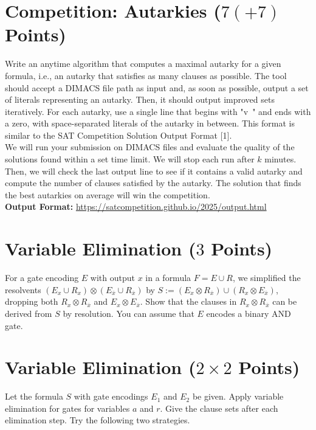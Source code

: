\documentclass[a4paper]{article}
\begin{document}

\newcommand{\statetilled}{T}
\newcommand{\statetobetilled}{$+$}
\newcommand{\statenottobetilled}{$-$}


\section{Competition: Autarkies ($7 (+7)$ Points)}
Write an anytime algorithm that computes a maximal autarky for a given formula, i.e., an autarky that satisfies as many clauses as possible.
The tool should accept a DIMACS file path as input and, as soon as possible, output a set of literals representing an autarky. 
Then, it should output improved sets iteratively.
For each autarky, use a single line that begins with "v~" and ends with a zero, with space-separated literals of the autarky in between. This format is similar to the SAT Competition Solution Output Format [1].\\

\noindent
We will run your submission on DIMACS files and evaluate the quality of the solutions found within a set time limit.
We will stop each run after $k$ minutes.
Then, we will check the last output line to see if it contains a valid autarky and compute the number of clauses satisfied by the autarky.
The solution that finds the best autarkies on average will win the competition.\\

\noindent
[1] \textbf{Output Format:} \url{https://satcompetition.github.io/2025/output.html}


\section{Variable Elimination ($3$ Points)}
For a gate encoding $E$ with output $x$ in a formula $F = E \cup R$,
we simplified the resolvents $(E_x \cup R_x) \otimes (E_{\overline x} \cup R_{\overline x})$ by
$S := (E_x \otimes R_{\overline x}) \cup (R_x \otimes E_{\overline x})$, dropping both
$R_x \otimes R_{\overline x}$ and $E_x \otimes E_{\overline x}$.
Show that the clauses in $R_x \otimes R_{\overline x}$ can be derived from $S$ by resolution.
You can assume that $E$ encodes a binary AND gate.


\section{Variable Elimination ($2 \times 2$ Points)}
Let the formula $S$ with gate encodings $E_1$ and $E_2$ be given.
Apply variable elimination for gates for variables $a$ and $r$.
Give the clause sets after each elimination step.
Try the following two strategies.
\end{document}
